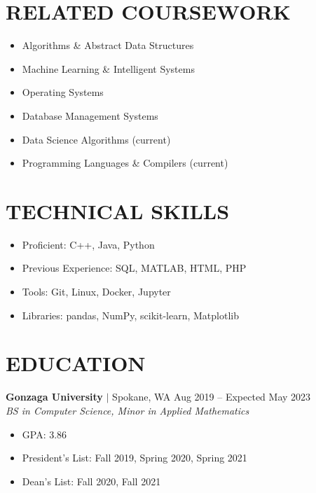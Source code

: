 \documentclass[11pt, a4paper, roman]{moderncv}
\newcommand{\education}[5]{
	\textbf{#1} $|$ #2
	\hfill#3
	\\\textit{#4}
	#5
	\vspace{2mm}
}
\begin{document}
\maketitle
\vspace*{-12mm}

\begin{multicols}{2}
\section{RELATED COURSEWORK}
{\begin{itemize}
    \item Algorithms \& Abstract Data Structures
    \item Machine Learning \& Intelligent Systems
    \item Operating Systems
    \item Database Management Systems
    \item Data Science Algorithms (current)
    \item Programming Languages \& Compilers (current)
  \end{itemize}
} 

\columnbreak  

\section{TECHNICAL SKILLS}
{\begin{itemize}
    \item Proficient: C++, Java, Python
    \item Previous Experience: SQL, MATLAB, HTML, PHP
    \item Tools: Git, Linux, Docker, Jupyter
    \item Libraries: pandas, NumPy, scikit-learn, Matplotlib
  \end{itemize}
}
\end{multicols}

\section{EDUCATION}

\education{Gonzaga University}{Spokane, WA}{Aug 2019 -- Expected May 2023}{BS in Computer Science, Minor in Applied Mathematics}
	{\begin{itemize}
    		\item GPA: 3.86
    		\item President's List: Fall 2019, Spring 2020, Spring 2021
    		\item Dean's List: Fall 2020, Fall 2021
  		\end{itemize}
}
\end{document}
